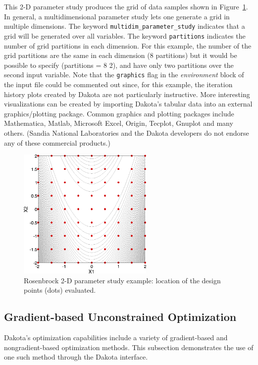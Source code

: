 This 2-D parameter study produces the grid of data samples shown in
Figure~\ref{tutorial:rosenbrock_multidim_graphics}. In general, a multidimensional 
parameter study lets one generate a grid in multiple dimensions. 
The keyword \texttt{multidim\_parameter\_study} indicates that 
a grid will be generated over all variables. The keyword 
\texttt{partitions} indicates the number of grid partitions in 
each dimension. For this example, the number of the grid partitions 
are the same in each dimension (8 partitions) but it would be possible 
to specify (partitions = 8 2), and have only two partitions 
over the second input variable.  Note that the
\texttt{graphics} flag in the \emph{environment} block of the input
file could be commented out since, for this example, the iteration
history plots created by Dakota are not particularly instructive. More
interesting visualizations can be created by importing Dakota's
tabular data into an external graphics/plotting package. Common
graphics and plotting packages include Mathematica, Matlab, Microsoft
Excel, Origin, Tecplot, Gnuplot and many others. (Sandia National Laboratories
and the Dakota developers do not endorse any of these commercial
products.)

\begin{figure}[htb!]
  \centering
  \includegraphics[height=2.5in]{images/rosen_2d_pts}
  \caption{Rosenbrock 2-D parameter study example:
  location of the design points (dots) evaluated.}
  \label{tutorial:rosenbrock_multidim_graphics}
\end{figure}


\subsection{Gradient-based Unconstrained Optimization}\label{tutorial:examples:optimization}

Dakota's optimization capabilities include a variety of gradient-based 
and nongradient-based optimization methods. This subsection demonstrates
the use of one such method through the Dakota interface.

